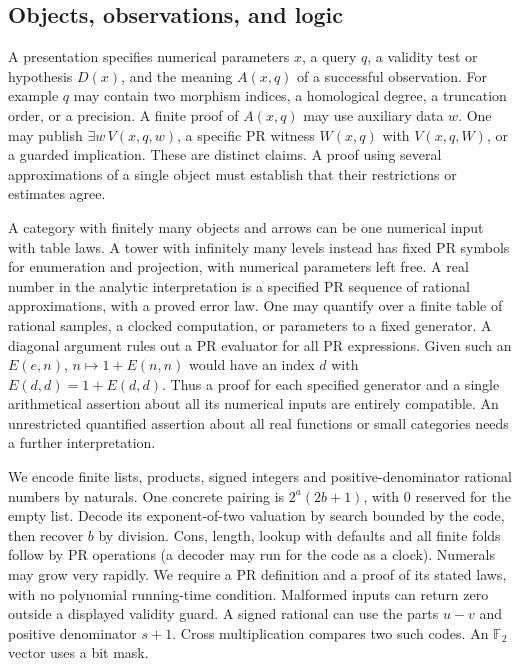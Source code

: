 \documentclass[11pt,letterpaper]{article}
\begin{document}
\subsection{Objects, observations, and logic}
A presentation specifies numerical parameters $x$, a query $q$, a validity test or hypothesis $D(x)$, and the meaning $A(x,q)$ of a successful observation. For example $q$ may contain two morphism indices, a homological degree, a truncation order, or a precision. A finite proof of $A(x,q)$ may use auxiliary data $w$. One may publish $\exists w\,V(x,q,w)$, a specific PR witness $W(x,q)$ with $V(x,q,W)$, or a guarded implication. These are distinct claims. A proof using several approximations of a single object must establish that their restrictions or estimates agree.

A category with finitely many objects and arrows can be one numerical input with table laws. A tower with infinitely many levels instead has fixed PR symbols for enumeration and projection, with numerical parameters left free. A real number in the analytic interpretation is a specified PR sequence of rational approximations, with a proved error law. One may quantify over a finite table of rational samples, a clocked computation, or parameters to a fixed generator. A diagonal argument rules out a PR evaluator for all PR expressions. Given such an $E(e,n)$, $n\mapsto 1+E(n,n)$ would have an index $d$ with $E(d,d)=1+E(d,d)$. Thus a proof for each specified generator and a single arithmetical assertion about all its numerical inputs are entirely compatible. An unrestricted quantified assertion about all real functions or small categories needs a further interpretation.

We encode finite lists, products, signed integers and positive-denominator rational numbers by naturals. One concrete pairing is $2^a(2b+1)$, with $0$ reserved for the empty list. Decode its exponent-of-two valuation by search bounded by the code, then recover $b$ by division. Cons, length, lookup with defaults and all finite folds follow by PR operations (a decoder may run for the code as a clock). Numerals may grow very rapidly. We require a PR definition and a proof of its stated laws, with no polynomial running-time condition. Malformed inputs can return zero outside a displayed validity guard. A signed rational can use the parts $u-v$ and positive denominator $s+1$. Cross multiplication compares two such codes. An $\mathbb F_2$ vector uses a bit mask.
\end{document}
